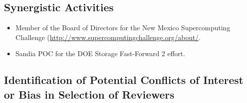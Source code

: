 \documentclass[11pt]{article}
\begin{document}
\subsection{Synergistic Activities}
\begin{itemize}
\item Member of the Board of Directors for the New Mexico Supercomputing Challenge (\url{http://www.supercomputingchallenge.org/about/}.
\item Sandia POC for the DOE Storage Fast-Forward 2 effort.
\end{itemize}
\subsection{Identification of Potential Conflicts of Interest or Bias in Selection of Reviewers}
\iffalse
\end{document}
